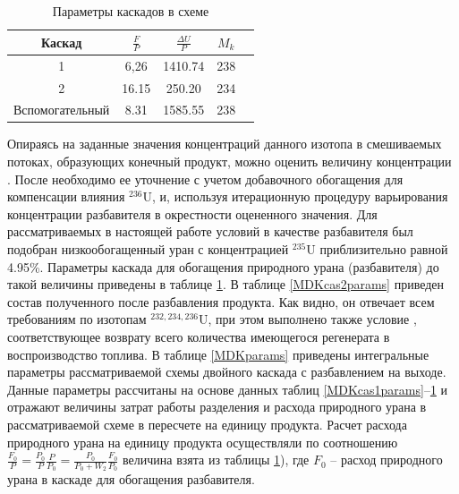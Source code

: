 \begin{table}
    \begin{tabular}{|c|c|c|c|c|}
        \hline Каскад & $\frac{F}{P}$ & $\frac{\Delta U}{P}$ & $M_{k}$\\
        \hline 1      &     6,26     &     1410.74       &    238   \\
               2      &     16.15    &     250.20        &    234   \\
        Вспомогательный  &   8.31    &     1585.55       &    238   \\
        \hline
    \end{tabular}
\caption{Параметры каскадов в схеме}\label{MDKcas_params}
\end{table}





Опираясь на заданные значения концентраций данного изотопа в смешиваемых потоках, образующих конечный продукт, можно оценить величину концентрации . После необходимо ее уточнение с учетом добавочного обогащения для компенсации влияния $^{236}$U, и, используя итерационную процедуру варьирования концентрации разбавителя в окрестности оцененного значения. Для рассматриваемых в настоящей работе условий в качестве разбавителя был подобран низкообогащенный уран с концентрацией $^{235}$U  приблизительно равной 4.95\%. Параметры каскада для обогащения природного урана (разбавителя) до такой величины приведены в таблице \ref{MDKcas_params}. В таблице \ref{MDKcas2params} приведен состав полученного после разбавления продукта. Как видно, он отвечает всем требованиям по изотопам $^{232,234,236}$U, при этом выполнено также условие , соответствующее возврату всего количества имеющегося регенерата в воспроизводство топлива. В таблице \ref{MDKparams} приведены интегральные параметры рассматриваемой схемы двойного каскада с разбавлением на выходе. Данные параметры рассчитаны на основе данных таблиц \ref{MDKcas1params}--\ref{MDKcas_params} и отражают величины затрат работы разделения и расхода природного урана в рассматриваемой схеме в пересчете на единицу продукта. Расчет расхода природного урана на единицу продукта осуществляли по соотношению $\frac{F_{0}}{P}=\frac{P_{0}}{P} \frac{P}{P_{0}}=\frac{P_{0}}{P_{0}+W_{2}} \frac{F_{0}}{P_{0}}$ величина взята из таблицы \ref{MDKcas_params}), где $F_{0}$ -- расход природного урана в каскаде для обогащения разбавителя.

